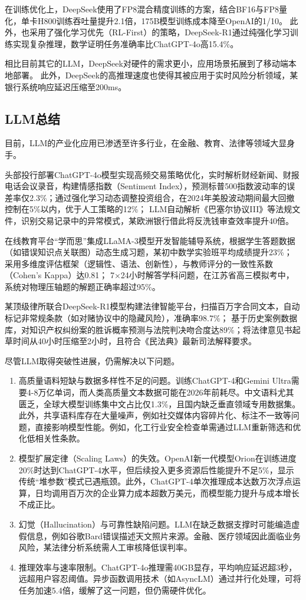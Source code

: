在训练优化上，DeepSeek使用了FP8混合精度训练的方案，结合BF16与FP8量化，单卡H800训练吞吐量提升2.1倍，175B模型训练成本降至OpenAI的1/10。
此外，也采用了​强化学习优先（RL-First）​的策略，DeepSeek-R1通过纯强化学习训练实现复杂推理，数学证明任务准确率比ChatGPT-4o高15.4\%。

相比目前其它的LLM，DeepSeek对硬件的需求更小，应用场景拓展到了移动端本地部署。
此外，DeepSeek的高推理速度也使得其被应用于实时风险分析领域，某银行系统响应延迟压缩至200ms。
\subsection{LLM总结}
目前，LLM的产业化应用已渗透至许多行业，在金融、教育、法律等领域大显身手。

头部投行部署ChatGPT-4o模型实现高频交易策略优化，实时解析财经新闻、财报电话会议录音，构建情感指数（Sentiment Index），预测标普500指数波动率的误差率仅2.3\%；
​通过强化学习动态调整投资组合，在2024年美股波动期间最大回撤控制在5\%以内，优于人工策略的12\%；
LLM自动解析《巴塞尔协议III》等法规文件，识别交易记录中的异常模式，某欧洲银行借此将反洗钱审查效率提升40倍。

在线教育平台“学而思”集成LLaMA-3模型开发智能辅导系统，根据学生答题数据（如错误知识点关联图）动态生成习题，某初中数学实验班平均成绩提升23\%；
采用多维度评估框架（逻辑性、语法、创新性），与教师评分的一致性系数（Cohen's Kappa）达0.81；
7×24小时解答学科问题，在江苏省高三模拟考中，系统对物理压轴题的解题正确率超过95\%。

某顶级律所联合DeepSeek-R1模型构建法律智能平台，扫描百万字合同文本，自动标记非常规条款（如对赌协议中的隐藏风险），准确率98.7\%；
基于历史案例数据库，对知识产权纠纷案的胜诉概率预测与法院判决吻合度达89\%；将法律意见书起草时间从40小时压缩至2小时，且符合《民法典》最新司法解释要求。

尽管LLM取得突破性进展，仍需解决以下问题。
\begin{enumerate}[nosep]
\item 高质量语料短缺与数据多样性不足的问题。训练ChatGPT-4和Gemini Ultra需要4-8万亿单词，而人类高质量文本数据可能在2026年前耗尽。中文语料尤其匮乏，全球大模型训练集中文占比仅1.3\%，且国内缺乏垂直领域专用数据集。此外，共享语料库存在大量噪声，例如社交媒体内容碎片化、标注不一致等问题，直接影响模型性能。例如，化工行业安全检查单需通过LLM重新筛选和优化低相关性条款。
\item 模型扩展定律（Scaling Laws）的失效。OpenAI新一代模型Orion在训练进度20\%时达到ChatGPT-4水平，但后续投入更多资源后性能提升不足5\%，显示传统“堆参数”模式已遇瓶颈。此外，ChatGPT-4单次推理成本达数万次浮点运算，日均调用百万次的企业算力成本超数万美元，而模型能力提升与成本增长不成正比。
\item 幻觉（Hallucination）与可靠性缺陷问题。LLM在缺乏数据支撑时可能编造虚假信息，例如谷歌Bard错误描述天文照片来源。金融、医疗领域因此面临业务风险，某法律分析系统需人工审核降低误判率。
\item 推理效率与速率限制。ChatGPT-4o推理需40GB显存，平均响应延迟超3秒，远超用户容忍阈值。异步函数调用技术（如AsyncLM）通过并行化处理，可将任务加速5.4倍，缓解了这一问题，但仍需硬件优化。
\end{enumerate}
